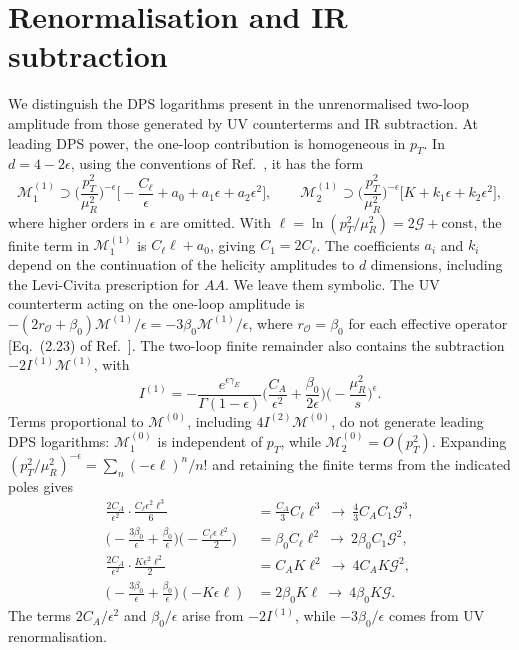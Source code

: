 \documentclass[%
 onecolumn,
 superscriptaddress,
 preprintnumbers,
 nofootinbib,
 amsmath,amssymb,
 aps,
 prl,
]{revtex4-2}
\newcommand{\G}{\mathcal G}
\newcommand{\M}{\mathcal M}
\begin{document}
\section{Renormalisation and IR subtraction}
\label{sec:subtraction}

We distinguish the DPS logarithms present in the
unrenormalised two-loop amplitude from those generated
by UV counterterms and IR subtraction.
At leading DPS power, the one-loop contribution is
homogeneous in $p_T$. In $d=4-2\epsilon$, using the
conventions of Ref.~\cite{Banerjee:2018lfq}, it has
the form
\begin{equation}
\M_1^{(1)}\supset
\Big(\frac{p_T^2}{\mu_R^2}\Big)^{-\epsilon}
\Big[-\frac{C_\ell}{\epsilon}+a_0
+a_1\epsilon+a_2\epsilon^2\Big],\qquad
\M_2^{(1)}\supset
\Big(\frac{p_T^2}{\mu_R^2}\Big)^{-\epsilon}
\big[K+k_1\epsilon+k_2\epsilon^2\big],
\label{eq:regionexp}
\end{equation}
where higher orders in $\epsilon$ are omitted.
With $\ell=\ln(p_T^2/\mu_R^2)=2\G+\text{const}$,
the finite term in $\M_1^{(1)}$ is
$C_\ell\ell+a_0$, giving $C_1=2C_\ell$.
The coefficients $a_i$ and $k_i$ depend on the
continuation of the helicity amplitudes to
$d$ dimensions, including the Levi-Civita
prescription for $AA$. We leave them symbolic.
%
The UV counterterm acting on the
one-loop amplitude is
$-(2r_{\mathcal O}+\beta_0)\M^{(1)}/\epsilon
=-3\beta_0\M^{(1)}/\epsilon$,
where $r_{\mathcal O}=\beta_0$ for each
effective operator [Eq.~(2.23) of
Ref.~\cite{Banerjee:2018lfq}].
The two-loop finite remainder also contains
the subtraction $-2I^{(1)}\M^{(1)}$, with~\cite{Catani:1998bh,Banerjee:2018lfq}
\begin{equation}
I^{(1)}=-\frac{e^{\epsilon\gamma_E}}{\Gamma(1-\epsilon)}
\Big(\frac{C_A}{\epsilon^2}+
\frac{\beta_0}{2\epsilon}\Big)
\Big(-\frac{\mu_R^2}{s}\Big)^\epsilon.
\label{eq:I1}
\end{equation}
Terms proportional to $\M^{(0)}$, including
$4I^{(2)}\M^{(0)}$, do not generate leading
DPS logarithms: $\M_1^{(0)}$ is independent
of $p_T$, while $\M_2^{(0)}=O(p_T^2)$.
%
Expanding
$(p_T^2/\mu_R^2)^{-\epsilon}
=\sum_n(-\epsilon\ell)^n/n!$
and retaining the finite terms from the
indicated poles gives
\begin{align}
\frac{2C_A}{\epsilon^2}
\cdot\frac{C_\ell\epsilon^2\ell^3}{6}
&=\frac{C_A}{3}C_\ell\ell^3
\ \to\ \frac43C_AC_1\G^3,\nonumber\\
\Big(-\frac{3\beta_0}{\epsilon}
+\frac{\beta_0}{\epsilon}\Big)
\Big(-\frac{C_\ell\epsilon\ell^2}{2}\Big)
&=\beta_0C_\ell\ell^2
\ \to\ 2\beta_0C_1\G^2,\nonumber\\
\frac{2C_A}{\epsilon^2}
\cdot\frac{K\epsilon^2\ell^2}{2}
&=C_AK\ell^2
\ \to\ 4C_AK\G^2,\nonumber\\
\Big(-\frac{3\beta_0}{\epsilon}
+\frac{\beta_0}{\epsilon}\Big)
(-K\epsilon\ell)
&=2\beta_0K\ell
\ \to\ 4\beta_0K\G.
\end{align}
The terms $2C_A/\epsilon^2$ and
$\beta_0/\epsilon$ arise from $-2I^{(1)}$,
while $-3\beta_0/\epsilon$ comes from
UV renormalisation.
\end{document}

